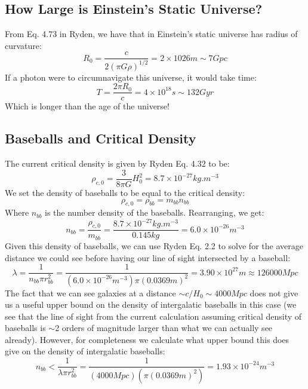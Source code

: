 \subsection{How Large is Einstein's Static Universe?}
From Eq. 4.73 in Ryden, we have that in Einstein's static universe has radius of curvature:
\begin{equation}
    \boxed{R_0 = \frac{c}{2(\pi G \rho)^{1/2}} = 2  \times 10{26}\si{m} \sim 7 \si{Gpc}}
\end{equation}
If a photon were to circumnavigate this universe, it would take time:
\begin{equation}
    \boxed{T = \frac{2\pi R_0}{c} = 4 \times 10^{18}\si{s} \sim 132\si{Gyr}}
\end{equation}
Which is longer than the age of the universe!

\subsection{Baseballs and Critical Density}
The current critical density is given by Ryden Eq. 4.32 to be:
\begin{equation}
    \rho_{c, 0} = \frac{3}{8\pi G}H_0^2 = 8.7 \times 10^{-27}\si{kg.m^{-3}}
\end{equation}
We set the density of baseballs to be equal to the critical density:
\begin{equation}
    \rho_{c, 0} = \rho_{bb} = m_{bb}n_{bb}
\end{equation}
Where $n_{bb}$ is the number density of the baseballs. Rearranging, we get:
\begin{equation}
    \boxed{n_{bb} = \frac{\rho_{c, 0}}{m_{bb}} = \frac{8.7 \times 10^{-27}\si{kg.m^{-3}}}{0.145\si{kg}} = 6.0 \times 10^{-26} \si{m^{-3}}}
\end{equation}
Given this density of baseballs, we can use Ryden Eq. 2.2 to solve for the average distance we could see before having our line of sight intersected by a baseball:
\begin{equation}
    \boxed{\lambda = \frac{1}{n_{bb}\pi r_{bb}^2} = \frac{1}{(6.0 \times 10^{-26} \si{m^{-3}})\pi (0.0369\si{m})^2} = 3.90 \times 10^{27}\si{m} \approx 126000 \si{Mpc}}
\end{equation}
The fact that we can see galaxies at a distance $\sim c/H_0 \sim 4000\si{Mpc}$ does not give us a useful upper bound on the density of intergalatic baseballs in this case (we see that the line of sight from the current calculation assuming critical density of baseballs is $\sim$2 orders of magnitude larger than what we can actually see already). However, for completeness we calculate what upper bound this does give on the density of intergalatic baseballs:
\begin{equation}
    \boxed{n_{bb} < \frac{1}{\lambda \pi r_{bb}^2} = \frac{1}{(4000\si{Mpc})(\pi (0.0369\si{m})^2)} = 1.93 \times 10^{-24}\si{m^{-3}}}
\end{equation}

